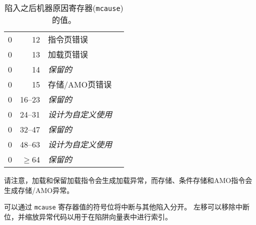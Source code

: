 \begin{table*}[htbp]
\begin{center}
\begin{tabular}{|r|r|l|l|}
  0         & 12              & 指令页错误 \\
  0         & 13              & 加载页错误 \\
  0         & 14              & {\em 保留的} \\
  0         & 15              & 存储/AMO页错误 \\
  0         & 16--23          & {\em 保留的} \\
  0         & 24--31          & {\em 设计为自定义使用} \\
  0         & 32--47          & {\em 保留的} \\
  0         & 48--63          & {\em 设计为自定义使用} \\
  0         & $\ge$64         & {\em 保留的} \\
  \hline

\end{tabular}
\end{center}
\caption{陷入之后机器原因寄存器({\tt mcause})的值。}
\label{mcauses}
\end{table*}

\iffalse
Note that load and load-reserved instructions generate load exceptions,
whereas store, store-conditional, and AMO instructions generate store/AMO
exceptions.
\fi
请注意，加载和保留加载指令会生成加载异常，而存储、条件存储和AMO指令会生成存储/AMO异常。

\iffalse
\begin{commentary}
Interrupts can be separated from other traps with a single branch on the sign of
the {\tt mcause} register value.  A shift left can remove the
interrupt bit and scale the exception codes to index into a trap
vector table.
\end{commentary}
\fi

\begin{commentary}
可以通过 {\tt mcause} 寄存器值的符号位将中断与其他陷入分开。 
左移可以移除中断位，并缩放异常代码以用于在陷阱向量表中进行索引。
\end{commentary}

\iffalse
\begin{commentary}
We do not distinguish privileged instruction exceptions from illegal
opcode exceptions.  This simplifies the architecture and also hides
details of which higher-privilege instructions are supported by an
implementation.  The privilege level servicing the trap can implement
a policy on whether these need to be distinguished, and if so, whether
a given opcode should be treated as illegal or privileged.
\end{commentary}
\fi

